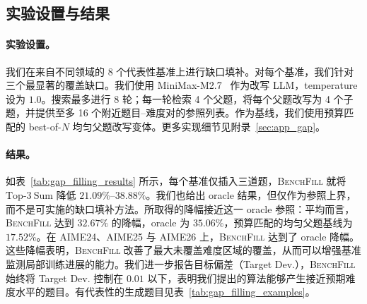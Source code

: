 \subsection{实验设置与结果}

\paragraph{实验设置。}
我们在来自不同领域的 8 个代表性基准上进行缺口填补。对每个基准，我们针对三个最显著的覆盖缺口。我们使用 MiniMax-M2.7~\cite{chen2026minimax} 作为改写 LLM，temperature 设为 $1.0$。搜索最多进行 8 轮；每一轮检索 4 个父题，将每个父题改写为 4 个子题，并提供至多 16 个附近题目--难度对的参照列表。作为基线，我们使用预算匹配的 best-of-\(N\) 均匀父题改写变体。更多实现细节见附录~\ref{sec:app_gap}。


\paragraph{结果。}
如表~\ref{tab:gap_filling_results} 所示，每个基准仅插入三道题，\textsc{BenchFill} 就将 $\mathrm{Top\text{-}3\ Sum}$ 降低 $21.09\%$--$38.88\%$。我们也给出 oracle 结果，但仅作为参照上界，而不是可实施的缺口填补方法。所取得的降幅接近这一 oracle 参照：平均而言，\textsc{BenchFill} 达到 $32.67\%$ 的降幅，oracle 为 $35.06\%$，预算匹配的均匀父题基线为 $17.52\%$。在 AIME24、AIME25 与 AIME26 上，\textsc{BenchFill} 达到了 oracle 降幅。这些降幅表明，\textsc{BenchFill} 改善了最大未覆盖难度区域的覆盖，从而可以增强基准监测局部训练进展的能力。我们进一步报告目标偏差（Target Dev.），\textsc{BenchFill} 始终将 Target Dev. 控制在 \(0.01\) 以下，表明我们提出的算法能够产生接近预期难度水平的题目。有代表性的生成题目见表~\ref{tab:gap_filling_examples}。

